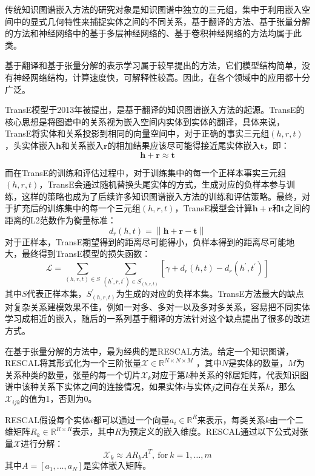 传统知识图谱嵌入方法的研究对象是知识图谱中独立的三元组，集中于利用嵌入空间中的显式几何特性来捕捉实体之间的不同关系，基于翻译的方法、基于张量分解的方法和神经网络中的基于多层神经网络的、基于卷积神经网络的方法均属于此类。

基于翻译和基于张量分解的表示学习属于较早提出的方法，它们模型结构简单，没有神经网络结构，计算速度快，可解释性较高。因此，在各个领域中的应用都十分广泛。

TransE模型于2013年被提出，是基于翻译的知识图谱嵌入方法的起源。TransE的核心思想是将图谱中的关系视为嵌入空间内实体到实体的翻译，具体来说，TransE将实体和关系投影到相同的向量空间中，对于正确的事实三元组$(h,r,t)$，头实体嵌入$\boldsymbol{h}$和关系嵌入$\boldsymbol{r}$的相加结果应该尽可能得接近尾实体嵌入$\boldsymbol{t}$，即：
\begin{equation}
  \boldsymbol{h}+\boldsymbol{r}\approx \boldsymbol{t}
\end{equation}

而在TransE的训练和评估过程中，对于训练集中的每一个正样本事实三元组$(h,r,t)$，TransE会通过随机替换头尾实体的方式，生成对应的负样本参与训练，这样的策略也成为了后续许多知识图谱嵌入方法的训练和评估策略。最终，对于扩充后的训练集中的每一个三元组$(h,r,t)$，TransE模型会计算$\boldsymbol{h}+\boldsymbol{r}$和$\boldsymbol{t}$之间的距离的L2范数作为衡量标准：
\begin{equation}
  d_r(h,t)=\left\lVert \boldsymbol{h}+\boldsymbol{r} - \boldsymbol{t}\right\rVert 
\end{equation}
对于正样本，TransE期望得到的距离尽可能得小，负样本得到的距离尽可能地大，最终得到TransE模型的损失函数：
\begin{equation}
  \mathcal{L} =\sum_{(h,r,t)\in S}\sum_{(h^\prime,r,t^\prime)\in S^\prime_{(h,r,t)}}\left[\gamma +d_r(h,t)-d_r(h^\prime,t^\prime)\right] 
\end{equation}
其中$S$代表正样本集，$S^\prime_{(h,r,t)}$为生成的对应的负样本集。TransE方法最大的缺点对复杂关系建模效果不佳，例如一对多、多对一以及多对多关系，容易把不同实体学习成相近的嵌入，随后的一系列基于翻译的方法针对这个缺点提出了很多的改进方式。

在基于张量分解的方法中，最为经典的是RESCAL方法。给定一个知识图谱，RESCAL将其形式化为一个三阶张量${\mathcal{X} \in \mathbb{R}^{N \times N \times M}}$ ，其中$N$是实体的数量，$M$为关系种类的数量，张量的每一个切片$\mathcal{X}_k$对应于第$k$种关系的邻居矩阵，代表知识图谱中该种关系下实体之间的连接情况，如果实体$i$与实体$j$之间存在关系$k$，那么$\mathcal{X}_{ijk}$的值为1，否则为0。

RESCAL假设每个实体$i$都可以通过一个向量$a_i \in \mathbb{R}^R$来表示，每类关系$k$由一个二维矩阵$R_k \in  \mathbb{R}^{R \times R}$表示，其中$R$为预定义的嵌入维度。RESCAL通过以下公式对张量$\mathcal{X}$进行分解：
\begin{equation}
  \mathcal{X}_k \approx A R_k A^T, \ \mbox{for} \ k=1,\ldots, m
\end{equation}
其中$A = [a_1,\ldots,a_N]$是实体嵌入矩阵。

